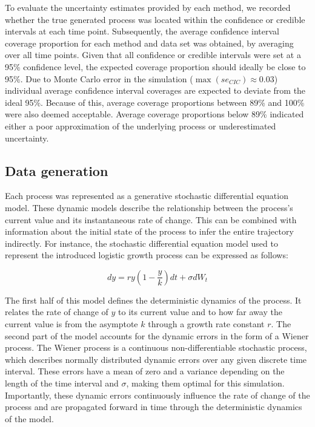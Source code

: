 \documentclass[man, floatsintext]{apa7}
\begin{document}
To evaluate the uncertainty estimates provided by each method, we recorded
whether the true generated process was located within the confidence or
credible intervals at each time point. Subsequently, the average confidence
interval coverage proportion for each method and data set was obtained, by
averaging over all time points. Given that all confidence or credible intervals
were set at a 95\% confidence level, the expected coverage proportion should
ideally be close to 95\%. Due to Monte Carlo error in the simulation
($\max(se_{CIC}) \approx 0.03$) individual average confidence interval
coverages are expected to deviate from the ideal 95\%. Because of this, average
coverage proportions between 89\% and 100\% were also deemed acceptable.
Average coverage proportions below 89\% indicated either a poor approximation
of the underlying process or underestimated uncertainty.

\subsection{Data generation}

Each process was represented as a generative stochastic differential
equation model. These dynamic models describe the relationship between the
process's current value and its instantaneous rate of change. This can be
combined with information about the initial state of the process to infer the
entire trajectory indirectly. For instance, the stochastic differential
equation model used to represent the introduced logistic growth process can be
expressed as follows:

\begin{equation} \label{eq:2}
  dy = r y (1-\frac{y}{k})dt + \sigma dW_t
\end{equation}

\noindent The first half of this model defines the deterministic dynamics of
the process. It relates the rate of change of $y$ to its current value and to
how far away the current value is from the asymptote $k$ through a growth rate
constant $r$. The second part of the model accounts for the dynamic errors in
the form of a Wiener process. The Wiener process is a continuous
non-differentiable stochastic process, which describes normally distributed
dynamic errors over any given discrete time interval. These errors have a mean
of zero and a variance depending on the length of the time interval and
$\sigma$, making them optimal for this simulation. Importantly, these dynamic
errors continuously influence the rate of change of the process and are
propagated forward in time through the deterministic dynamics of the model.
\end{document}
